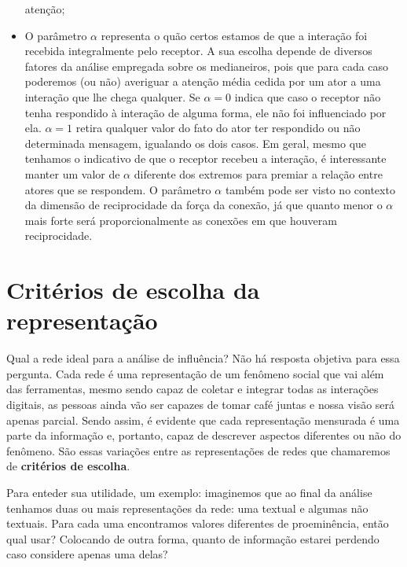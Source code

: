 \begin{itemize}
  atenção;
  \item O parâmetro $\alpha$ representa o quão certos estamos de que a interação
  foi recebida integralmente pelo receptor. A sua escolha depende de diversos
  fatores da análise empregada sobre os medianeiros, pois que para cada caso
  poderemos (ou não) averiguar a atenção média cedida por um ator a uma
  interação que lhe chega qualquer. Se $\alpha=0$ indica que caso o receptor não
  tenha respondido à interação de alguma forma, ele não foi influenciado por
  ela. $\alpha=1$ retira qualquer valor do fato do ator ter respondido ou não
  determinada mensagem, igualando os dois casos. Em geral, mesmo que tenhamos o
  indicativo de que o receptor recebeu a interação, é interessante manter um
  valor de $\alpha$ diferente dos extremos para premiar a relação entre atores
  que se respondem. O parâmetro $\alpha$ também pode ser visto no contexto da
  dimensão de reciprocidade da força da conexão, já que quanto menor o $\alpha$
  mais forte será proporcionalmente as conexões em que houveram reciprocidade.
\end{itemize}

\section{Critérios de escolha da representação}
\label{sec:criterios}
Qual a rede ideal para a análise de influência? Não há resposta objetiva para
essa pergunta. Cada rede é uma representação de um fenômeno social que vai além
das ferramentas, mesmo sendo capaz de coletar e integrar todas as interações
digitais, as pessoas ainda vão ser capazes de tomar café juntas e nossa visão
será apenas parcial. Sendo assim, é evidente que cada representação mensurada é
uma parte da informação e, portanto, capaz de descrever aspectos diferentes ou
não do fenômeno. São essas variações entre as representações de redes que
chamaremos de \textbf{critérios de escolha}.

Para enteder sua utilidade, um exemplo: imaginemos que ao final da análise
tenhamos duas ou mais representações da rede: uma textual e algumas não textuais.
Para cada uma encontramos valores diferentes de proeminência, então qual usar?
Colocando de outra forma, quanto de informação estarei perdendo caso considere
apenas uma delas?

